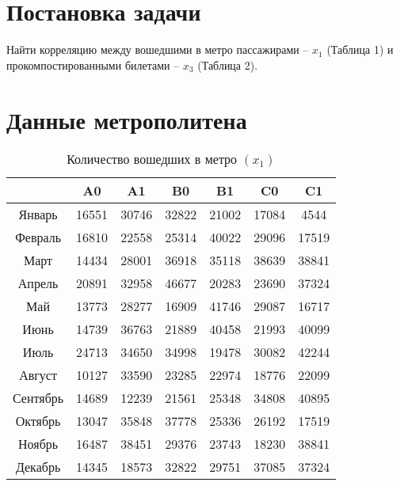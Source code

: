 \section{Постановка задачи}
    Найти корреляцию между вошедшими в метро пассажирами -- $x_1$ (Таблица 1) и прокомпостированными билетами -- $x_3$ (Таблица 2).

\section{Данные метрополитена} %
        \begin{table}[h!]%
        \centering
            \begin{tabular}{|c|c|c|c|c|c|c|} \hline
                     &   A0  &   A1  &   B0  &   B1  &   C0  &   C1  \\ \hline
            Январь   & 16551 & 30746 & 32822 & 21002 & 17084 & 4544  \\ \hline
            Февраль  & 16810 & 22558 & 25314 & 40022 & 29096 & 17519 \\ \hline
            Март     & 14434 & 28001 & 36918 & 35118 & 38639 & 38841 \\ \hline
            Апрель   & 20891 & 32958 & 46677 & 20283 & 23690 & 37324 \\ \hline
            Май      & 13773 & 28277 & 16909 & 41746 & 29087 & 16717 \\ \hline
            Июнь     & 14739 & 36763 & 21889 & 40458 & 21993 & 40099 \\ \hline
            Июль     & 24713 & 34650 & 34998 & 19478 & 30082 & 42244 \\ \hline
            Август   & 10127 & 33590 & 23285 & 22974 & 18776 & 22099 \\ \hline
            Сентябрь & 14689 & 12239 & 21561 & 25348 & 34808 & 40895 \\ \hline
            Октябрь  & 13047 & 35848 & 37778 & 25336 & 26192 & 17519 \\ \hline
            Ноябрь   & 16487 & 38451 & 29376 & 23743 & 18230 & 38841 \\ \hline
            Декабрь  & 14345 & 18573 & 32822 & 29751 & 37085 & 37324 \\ \hline
            \end{tabular}
        \caption{Количество вошедших в метро $(x_1)$}
        \end{table}

